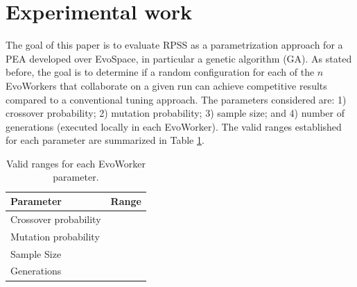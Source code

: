 \documentclass{sig-alternate}
\begin{document}

\section{Experimental work}
\label{sec:experiments}
The goal of this paper is to evaluate RPSS as a parametrization approach for a PEA developed over EvoSpace,
in particular a genetic algorithm (GA).
As stated before, the goal is to determine if a random configuration for each of the $n$ EvoWorkers that collaborate on a given run
can achieve competitive results compared to a conventional tuning approach.
The parameters considered are: 1) crossover probability; 2) mutation probability; 3) sample size;
and 4) number of generations (executed locally in each EvoWorker).
The valid ranges established for each parameter are summarized in Table \ref{tab:params}.

\begin{table}[!t]
\caption{Valid ranges for each EvoWorker parameter.}
\label{tab:params}
\centering
\begin{tabular}{|l|c|}
\hline
\textbf{Parameter} & \textbf{Range} \\
\hline
\hline
Crossover probability & \\
Mutation probability & \\
Sample Size & \\
Generations & \\
\hline
\end{tabular}
\end{table}
\end{document}
